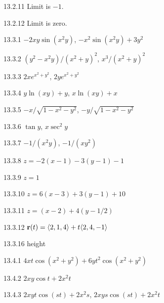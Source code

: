 \begin{Answer}{13.2.11}
Limit is $-1$.
\end{Answer}
\begin{Answer}{13.2.12}
Limit is zero.
\end{Answer}
\begin{Answer}{13.3.1}
$-2xy\sin(x^2y)$, $-x^2\sin(x^2y)+3y^2$
\end{Answer}
\begin{Answer}{13.3.2}
$(y^2-x^2y)/(x^2+y)^2$, $x^3/(x^2+y)^2$
\end{Answer}
\begin{Answer}{13.3.3}
$2xe^{x^2+y^2}$, $2ye^{x^2+y^2}$
\end{Answer}
\begin{Answer}{13.3.4}
$y\ln(xy)+y$, $x\ln(xy)+x$
\end{Answer}
\begin{Answer}{13.3.5}
$-x/\sqrt{1-x^2-y^2}$, $-y/\sqrt{1-x^2-y^2}$
\end{Answer}
\begin{Answer}{13.3.6}
$\tan y$, $x\sec^2 y$
\end{Answer}
\begin{Answer}{13.3.7}
$-1/(x^2y)$, $-1/(xy^2)$
\end{Answer}
\begin{Answer}{13.3.8}
$z=-2(x-1)-3(y-1)-1$
\end{Answer}
\begin{Answer}{13.3.9}
$z=1$
\end{Answer}
\begin{Answer}{13.3.10}
$z=6(x-3)+3(y-1)+10$
\end{Answer}
\begin{Answer}{13.3.11}
$z=(x-2)+4(y-1/2)$
\end{Answer}
\begin{Answer}{13.3.12}
${\bf r}(t)=\langle 2,1,4\rangle+t\langle 2,4,-1\rangle$
\end{Answer}
\begin{Answer}{13.3.16}
		height
	
\end{Answer}
\begin{Answer}{13.4.1}
$4xt\cos(x^2+y^2)+6yt^2\cos(x^2+y^2)$
\end{Answer}
\begin{Answer}{13.4.2}
$2xy\cos t+2x^2t$
\end{Answer}
\begin{Answer}{13.4.3}
$2xyt\cos(st)+2x^2s$, $2xys\cos(st)+2x^2t$
\end{Answer}
